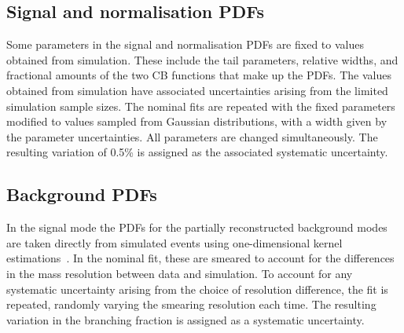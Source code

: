 

\subsection{Signal and normalisation PDFs}

Some parameters in the signal and normalisation PDFs are fixed to values obtained from simulation. These include the tail parameters, relative widths, and fractional amounts of the two CB functions that make up the PDFs. The values obtained from simulation have associated uncertainties arising from the limited simulation sample sizes. The nominal fits are repeated with the fixed parameters modified to values sampled from Gaussian distributions, with a width given by the parameter uncertainties. All parameters are changed simultaneously. The resulting variation of 0.5\% is assigned as the associated systematic uncertainty. 

\subsection{Background PDFs}

In the signal mode the PDFs for the partially reconstructed background modes are taken directly from simulated events using one-dimensional kernel estimations~\cite{Cranmer:2000du}. In the nominal fit, these are smeared to account for the differences in the mass resolution between data and simulation. To account for any systematic uncertainty arising from the choice of resolution difference, the fit is repeated, randomly varying the smearing resolution each time. The resulting variation in the branching fraction is assigned as a systematic uncertainty. 

